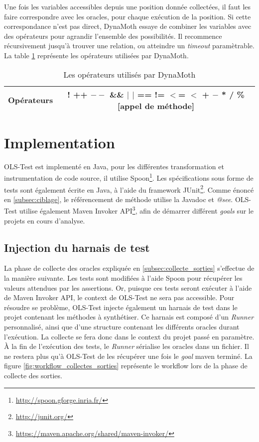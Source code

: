 \par Une fois les variables accessibles depuis une position donnée collectées, il faut les faire correspondre avec les oracles, pour chaque exécution de la position. Si cette correspondance n'est pas direct, DynaMoth essaye de combiner les variables avec des opérateurs pour agrandir l'ensemble des possibilités. Il recommence récursivement jusqu'à trouver une relation, ou atteindre un \textit{timeout} paramètrable. La table \ref{fig:operateurs} représente les opérateurs utilisées par DynaMoth.

\begin{table}[H]
\centering
\begin{tabular}{|c|c|}
\hline
Opérateurs & ! ++ $--$ \&\& $|$ $|$ == != $<$= $<$ + $-$ * / \% [appel de méthode]\\
\hline
\end{tabular}
\caption{Les opérateurs utilisés par DynaMoth}
\label{fig:operateurs}
\end{table}
 

\section{Implementation}
\label{sec:implementation}

\par OLS-Test est implementé en Java, pour les différentes transformation et instrumentation de code source, il utilise Spoon\footnote{\url{http://spoon.gforge.inria.fr/}}. Les spécifications sous forme de tests sont également écrite en Java, à l'aide du framework JUnit\footnote{\url{http://junit.org/}}. Comme énoncé en \ref{subsec:ciblage}, le référencement de méthode utilise la Javadoc et \textit{@see}. OLS-Test utilise également Maven Invoker API\footnote{\url{https://maven.apache.org/shared/maven-invoker/}}, afin de démarrer différent \textit{goals} sur le projets en cours d'analyse.


\subsection{Injection du harnais de test}

\par La phase de collecte des oracles expliquée en \ref{subsec:collecte_sorties} s'effectue de la manière suivante. Les tests sont modifiées à l'aide Spoon pour récupérer les valeurs attendues par les assertions. Or, puisque ces tests seront exécuter à l'aide de Maven Invoker API, le context de OLS-Test ne sera pas accessible. Pour résoudre se problème, OLS-Test injecte également un harnais de test dans le projet contenant les méthodes à synthétiser. Ce harnais est composé d'un \textit{Runner} personnalisé, ainsi que d'une structure contenant les différents oracles durant l'exécution. La collecte se fera donc dans le context du projet passé en paramètre. À la fin de l'exécution des tests, le \textit{Runner} sérialise les oracles dans un fichier. Il ne restera plus qu'à OLS-Test de les récupérer une fois le \textit{goal} maven terminé. La figure \ref{fig:workflow_collectes_sorties} représente le workflow lors de la phase de collecte des sorties.

